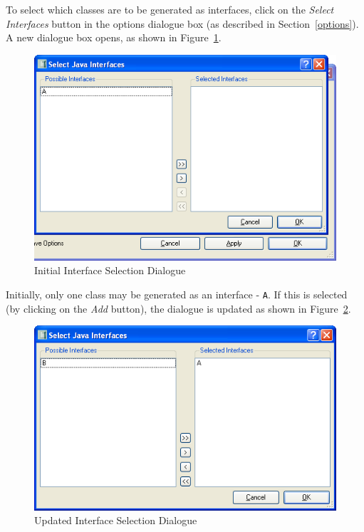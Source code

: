 \documentclass[\pformat,11pt]{article}
\begin{document}
To select which classes are to be generated as interfaces, click on
the \textit{Select Interfaces} button in the options dialogue box (as
described in Section~\ref{options}). A new dialogue box opens, as
shown in Figure~\ref{fig:interfaces1}.

\begin{figure}
\begin{center}
\includegraphics[width=.8\textwidth]{interfaces1}
\end{center}
\caption{Initial Interface Selection Dialogue}\label{fig:interfaces1}
\end{figure}

Initially, only one class may be generated as an interface -
\texttt{A}. If this is selected (by clicking on the \textit{Add}
button), the dialogue is updated as shown in Figure~\ref{fig:interfaces2}.

\begin{figure}
\begin{center}
\includegraphics[width=.8\textwidth]{interfaces2}
\end{center}
\caption{Updated Interface Selection Dialogue}\label{fig:interfaces2}
\end{figure}
\end{document}
